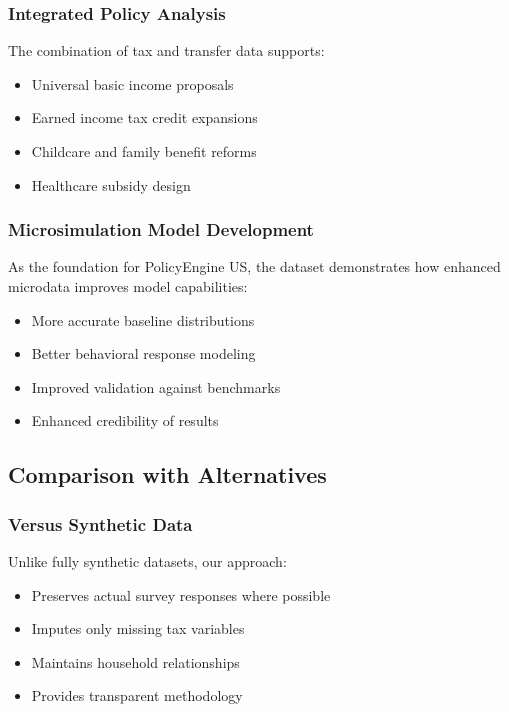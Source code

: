 \subsubsection{Integrated Policy Analysis}

The combination of tax and transfer data supports:
\begin{itemize}
\item Universal basic income proposals
\item Earned income tax credit expansions
\item Childcare and family benefit reforms
\item Healthcare subsidy design
\end{itemize}

\subsubsection{Microsimulation Model Development}

As the foundation for PolicyEngine US, the dataset demonstrates how enhanced microdata improves model capabilities:
\begin{itemize}
\item More accurate baseline distributions
\item Better behavioral response modeling
\item Improved validation against benchmarks
\item Enhanced credibility of results
\end{itemize}

\subsection{Comparison with Alternatives}

\subsubsection{Versus Synthetic Data}

Unlike fully synthetic datasets, our approach:
\begin{itemize}
\item Preserves actual survey responses where possible
\item Imputes only missing tax variables
\item Maintains household relationships
\item Provides transparent methodology
\end{itemize}

